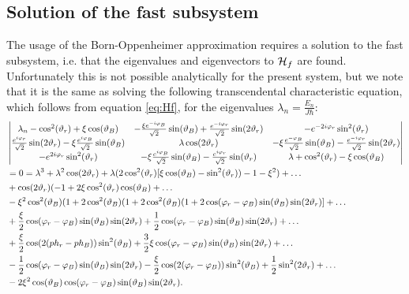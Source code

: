\documentclass[a4paper]{article}
\begin{document}
\subsection{Solution of the fast subsystem}
The usage of the Born-Oppenheimer approximation requires a solution to the fast subsystem,
i.e. that the eigenvalues and eigenvectors to \(\mathbb{\cal H}_f\) are found.
Unfortunately this is not possible analytically for the present system, but we note that it
is the same as solving the following transcendental characteristic equation, which follows
from equation \ref{eq:Hf}, for the
eigenvalues \(\lambda_n = \frac{E_n}{J\hbar{}}\): %
\begin{align}
         & \mdet{
                \lambda_n - \cos[2](\vartheta_r) + \xi \cos(\vartheta_B) & -\frac{\xi
                e^{-i\varphi_B}}{\sqrt{2} }\sin(\vartheta_B) +
                        \frac{e^{-i\varphi_r}}{\sqrt{2} }\sin(2\vartheta_r) &
                        -e^{-2i\varphi_r}\sin[2](\vartheta_r)\\
                        \frac{e^{i\varphi_r}}{\sqrt{2}}\sin(2\vartheta_r) - \xi
                        \frac{e^{i\varphi_B}}{\sqrt{2} }\sin(\vartheta_B) & \lambda
                        \cos(2\vartheta_r) & -\xi \frac{e^{-\varphi_B}}{\sqrt{2}
                        }\sin(\vartheta_B)-\frac{e^{-i\varphi_r}}{\sqrt{2}
                }\sin(2\vartheta_r)\\
                -e^{2i\varphi_r}\sin[2](\vartheta_r) & -\xi \frac{e^{i\varphi_B}}{\sqrt{2}
                }\sin(\vartheta_B) - \frac{e^{i\varphi_r}}{\sqrt{2}}\sin(\vartheta_r) &
                \lambda + \cos[2](\vartheta_r) - \xi\cos(\vartheta_B)}\nonumber\\
                &= 0 = \lambda^3 + \lambda^2\cos(2\vartheta_r) +
                \lambda(2\cos[2](\vartheta_r)[\xi\cos(\vartheta_B)-\sin[2](\vartheta_r))-1-\xi^2)
                +\dots\nonumber\\
                &+\cos(2\vartheta_r)(-1 +
                2\xi\cos[2](\vartheta_r)\cos(\vartheta_B)+\dots\nonumber\\
                &-\xi^2\cos[2](\vartheta_B)(1+2\cos[2](\vartheta_B)(1+2\cos[2](\vartheta_B)(1+2\cos(\varphi_r-\varphi_B)\sin(\vartheta_B)\sin(2\vartheta_r)]+\dots\nonumber\\
                &+
                \frac{\xi}{2}\cos(\varphi_r-\varphi_B)\sin(\vartheta_B)\sin(2\vartheta_r) +
                \frac{1}{2}\cos(\varphi_r-\varphi_B)\sin(\vartheta_B)\sin(2\vartheta_r) +
                \dots\nonumber\\
                &+ \frac{\xi}{2}\cos(2(ph_r-ph_B))\sin[2](\vartheta_B) +
                \frac{3}{2}\xi\cos(\varphi_r-\varphi_B)\sin(\vartheta_B)\sin(2\vartheta_r)
                +\dots\nonumber\\
                &- \frac{1}{2}\cos(\varphi_r-\varphi_B)\sin(\vartheta_B)\sin(2\vartheta_r)
                - \frac{\xi}{2}\cos(2(\varphi_r-\varphi_B))\sin[2](\vartheta_B) +
                \frac{1}{2}\sin[2](2\vartheta_r)+\dots\nonumber\\
                &- 2\xi^2\cos(\vartheta_B)\cos(\varphi_r-\varphi_B)\sin(\vartheta_B)\sin(2\vartheta_r)
                 \label{eq:lambda}
.\end{align} %
\end{document}
